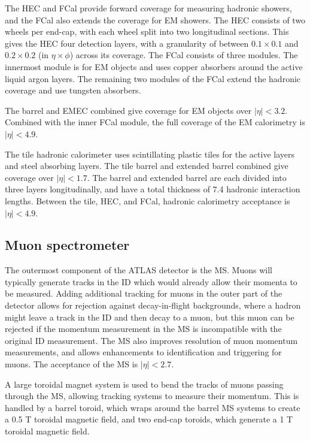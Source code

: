 The \ac{HEC} and \ac{FCal} provide forward coverage for measuring hadronic
showers, and the \ac{FCal} also extends the coverage for \ac{EM} showers. The
\ac{HEC} consists of two wheels per end-cap, with each wheel split into two
longitudinal sections. This gives the \ac{HEC} four detection layers, with a
granularity of between $0.1\times0.1$ and $0.2\times0.2$ (in $\eta\times\phi$)
across its coverage.  The \ac{FCal} consists of three modules. The innermost
module is for \ac{EM} objects and uses copper absorbers around the active liquid
argon layers. The remaining two modules of the \ac{FCal} extend the hadronic
coverage and use tungsten absorbers.

The barrel and \ac{EMEC} combined give coverage for \ac{EM} objects over $|\eta| <
3.2$. Combined with the inner \ac{FCal} module, the full coverage of the \ac{EM}
calorimetry is $|\eta| < 4.9$.

The tile hadronic calorimeter uses scintillating plastic tiles for the active
layers and steel absorbing layers. The tile barrel and extended barrel combined
give coverage over $|\eta| < 1.7$. The barrel and extended barrel are each divided
into three layers longitudinally, and have a total thickness of 7.4 hadronic
interaction lengths. 
Between the tile, \ac{HEC}, and \ac{FCal}, hadronic calorimetry acceptance is
$|\eta| < 4.9$.

\subsection{Muon spectrometer}

The outermost component of the \ac{ATLAS} detector is the \ac{MS}. Muons will
typically generate tracks in the \ac{ID} which would already allow their momenta
to be measured. Adding additional tracking for muons in the outer part of the
detector allows for rejection against decay-in-flight backgrounds, where a
hadron might leave a track in the \ac{ID} and then decay to a muon, but this
muon can be rejected if the momentum measurement in the \ac{MS} is incompatible
with the original \ac{ID} measurement.  The \ac{MS} also improves resolution of
muon momentum measurements, and allows enhancements to identification and
triggering for muons. The acceptance of the \ac{MS} is $|\eta| < 2.7$.

A large toroidal magnet system is used to bend the tracks of muons passing
through the \ac{MS}, allowing tracking systems to measure their momentum.
This is handled by a barrel toroid, which wraps around the barrel \ac{MS} systems
to create a 0.5 T toroidal magnetic field, and two end-cap toroids, which
generate a 1 T toroidal magnetic field.


